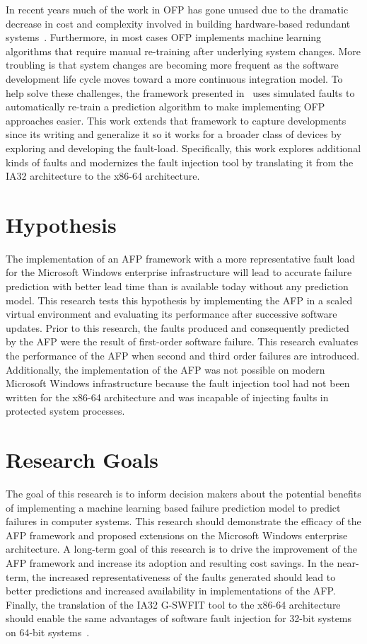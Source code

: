 In recent years much of the work in OFP has gone unused due to the dramatic
decrease in cost and complexity involved in building hardware-based redundant
systems~\cite{irrera2015}.  Furthermore, in most cases OFP implements machine
learning algorithms that require manual re-training after underlying system
changes.  More troubling is that system changes are becoming more frequent as
the software development life cycle moves toward a more continuous integration
model.  To help solve these challenges, the framework presented
in~\cite{irrera2015} uses simulated faults to automatically re-train a
prediction algorithm to make implementing OFP approaches easier.  This work
extends that framework to capture developments since its writing and generalize
it so it works for a broader class of devices by exploring and developing the
fault-load.  Specifically, this work explores additional kinds of faults and
modernizes the fault injection tool by translating it from the IA32
architecture to the x86-64 architecture.

\section{Hypothesis}
The implementation of an AFP framework with a more representative fault load
for the Microsoft Windows enterprise infrastructure will lead to accurate
failure prediction with better lead time than is available today without any
prediction model.  This research tests this hypothesis by implementing the AFP
in a scaled virtual environment and evaluating its performance after successive
software updates.  Prior to this research, the faults produced and consequently
predicted by the AFP were the result of first-order software failure.  This
research evaluates the performance of the AFP when second and third order
failures are introduced.  Additionally, the implementation of the AFP was not
possible on modern Microsoft Windows infrastructure because the fault injection
tool had not been written for the x86-64 architecture and was incapable of
injecting faults in protected system processes.

\section{Research Goals}
The goal of this research is to inform decision makers about the potential
benefits of implementing a machine learning based failure prediction model to
predict failures in computer systems.  This research should demonstrate the
efficacy of the AFP framework and proposed extensions on the Microsoft Windows
enterprise architecture.  A long-term goal of this research is to drive the
improvement of the AFP framework and increase its adoption and resulting cost
savings.  In the near-term, the increased representativeness of the faults
generated should lead to better predictions and increased availability in
implementations of the AFP.  Finally, the translation of the IA32 G-SWFIT tool
to the x86-64 architecture should enable the same advantages of software fault
injection for 32-bit systems on 64-bit systems~\cite{gswfit}.

